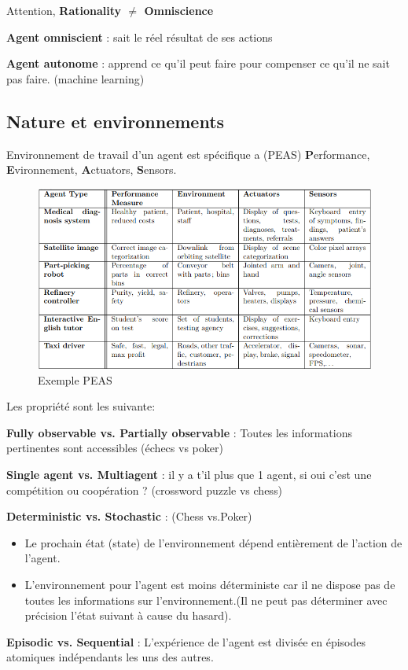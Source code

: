 	Attention, \textbf{Rationality $\neq$ Omniscience}
	
	\textbf{Agent omniscient} : sait le réel résultat de ses actions
	
	\textbf{Agent autonome} : apprend ce qu'il peut faire pour compenser ce qu'il ne sait pas faire. (machine learning)
	
\subsection{Nature et environnements}
	Environnement de travail d'un agent est spécifique a (PEAS) \textbf{P}erformance, \textbf{E}vironnement, \textbf{A}ctuators, \textbf{S}ensors.
	
	\begin{figure}[H]
		\centering
		\includegraphics[width=\textwidth]{img/PEASexemple.png}
		\caption{Exemple PEAS}
	\end{figure}	
	
	Les propriété sont les suivante:
	
	\textbf{Fully observable vs. Partially observable} : Toutes les informations pertinentes sont accessibles (échecs vs poker)
	
	\textbf{Single agent vs. Multiagent} : il y a t'il plus que 1 agent, si oui c'est une compétition ou coopération ? (crossword puzzle vs chess)
	
	\textbf{Deterministic vs. Stochastic} : (Chess vs.Poker)
	\begin{itemize}
		\item Le prochain état (state) de l'environnement dépend entièrement de l'action de l'agent.
		\item L'environnement pour l'agent est moins déterministe car il ne dispose pas de toutes les informations sur l'environnement.(Il ne peut pas déterminer avec précision l'état suivant à cause du hasard).
	\end{itemize}
	\textbf{Episodic vs. Sequential} : L'expérience de l'agent est divisée en épisodes atomiques indépendants les uns des autres.
	
